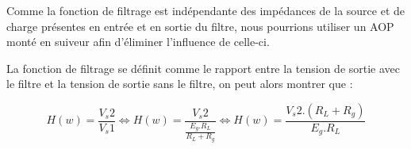 Comme la fonction de filtrage est indépendante des impédances de la source et de charge présentes en entrée et en sortie du filtre, nous pourrions utiliser un AOP monté en suiveur afin d'éliminer l'influence de celle-ci.

La fonction de filtrage se définit comme le rapport entre la tension de sortie avec le filtre et la tension de sortie sans le filtre, on peut alors montrer que :

$$ H(w) = \frac{V_s2}{V_s1} \iff H(w) =\frac{V_s2}{\frac{E_g . R_L}{R_L + R_g}} \iff H(w) = \frac{V_s2 . (R_L + R_g)}{E_g . R_L} $$ 















